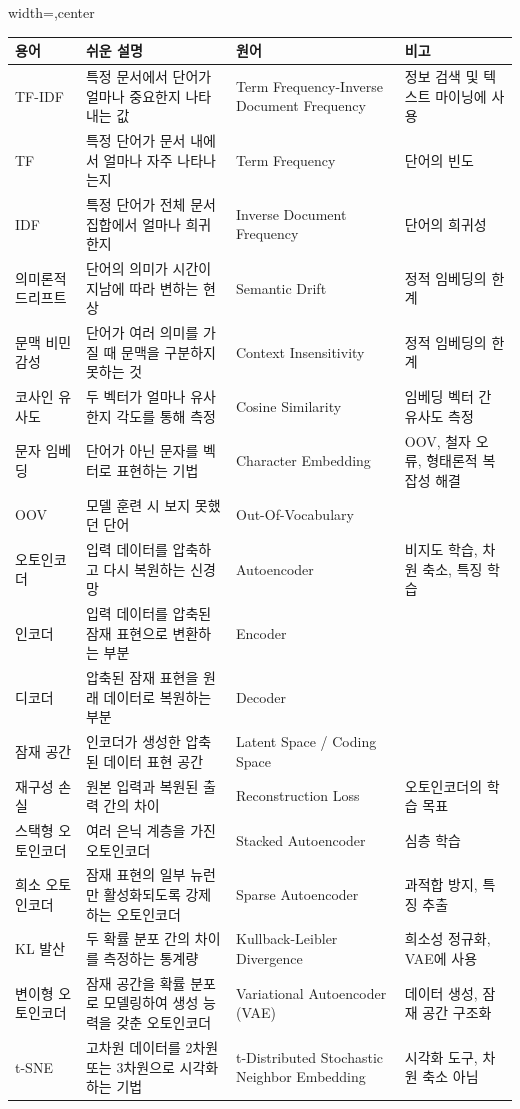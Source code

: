 \documentclass[11pt,a4paper]{article}
\theoremstyle{definition}
\begin{document}
\begin{adjustbox}{width=\textwidth,center}
\begin{tabular}{llll}
\toprule
\textbf{용어} & \textbf{쉬운 설명} & \textbf{원어} & \textbf{비고} \\
\midrule
TF-IDF & 특정 문서에서 단어가 얼마나 중요한지 나타내는 값 & Term Frequency-Inverse Document Frequency & 정보 검색 및 텍스트 마이닝에 사용 \\
TF & 특정 단어가 문서 내에서 얼마나 자주 나타나는지 & Term Frequency & 단어의 빈도 \\
IDF & 특정 단어가 전체 문서 집합에서 얼마나 희귀한지 & Inverse Document Frequency & 단어의 희귀성 \\
의미론적 드리프트 & 단어의 의미가 시간이 지남에 따라 변하는 현상 & Semantic Drift & 정적 임베딩의 한계 \\
문맥 비민감성 & 단어가 여러 의미를 가질 때 문맥을 구분하지 못하는 것 & Context Insensitivity & 정적 임베딩의 한계 \\
코사인 유사도 & 두 벡터가 얼마나 유사한지 각도를 통해 측정 & Cosine Similarity & 임베딩 벡터 간 유사도 측정 \\
문자 임베딩 & 단어가 아닌 문자를 벡터로 표현하는 기법 & Character Embedding & OOV, 철자 오류, 형태론적 복잡성 해결 \\
OOV & 모델 훈련 시 보지 못했던 단어 & Out-Of-Vocabulary & \\
오토인코더 & 입력 데이터를 압축하고 다시 복원하는 신경망 & Autoencoder & 비지도 학습, 차원 축소, 특징 학습 \\
인코더 & 입력 데이터를 압축된 잠재 표현으로 변환하는 부분 & Encoder & \\
디코더 & 압축된 잠재 표현을 원래 데이터로 복원하는 부분 & Decoder & \\
잠재 공간 & 인코더가 생성한 압축된 데이터 표현 공간 & Latent Space / Coding Space & \\
재구성 손실 & 원본 입력과 복원된 출력 간의 차이 & Reconstruction Loss & 오토인코더의 학습 목표 \\
스택형 오토인코더 & 여러 은닉 계층을 가진 오토인코더 & Stacked Autoencoder & 심층 학습 \\
희소 오토인코더 & 잠재 표현의 일부 뉴런만 활성화되도록 강제하는 오토인코더 & Sparse Autoencoder & 과적합 방지, 특징 추출 \\
KL 발산 & 두 확률 분포 간의 차이를 측정하는 통계량 & Kullback-Leibler Divergence & 희소성 정규화, VAE에 사용 \\
변이형 오토인코더 & 잠재 공간을 확률 분포로 모델링하여 생성 능력을 갖춘 오토인코더 & Variational Autoencoder (VAE) & 데이터 생성, 잠재 공간 구조화 \\
t-SNE & 고차원 데이터를 2차원 또는 3차원으로 시각화하는 기법 & t-Distributed Stochastic Neighbor Embedding & 시각화 도구, 차원 축소 아님 \\
\bottomrule
\end{tabular}
\end{adjustbox}
\end{document}
